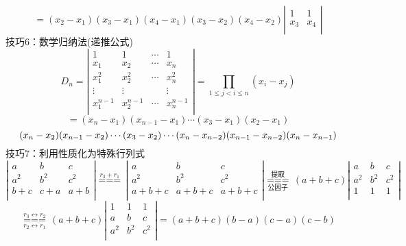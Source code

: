 $$
=({{x}_{2}}-{{x}_{1}})({{x}_{3}}-{{x}_{1}})({{x}_{4}}-{{x}_{1}})({{x}_{3}}-{{x}_{2}})({{x}_{4}}-{{x}_{2}})\left| \begin{matrix}
    1 & 1  \\
    {{x}_{3}} & {{x}_{4}}  \\
 \end{matrix} \right| 
$$
{\color{blue}技巧6：}数学归纳法(递推公式)
$$
D_{n}=\left| \begin{matrix}
    1 & 1 & \cdots  & 1  \\
    {{x}_{1}} & {{x}_{2}} & \cdots  & {{x}_{n}}  \\
    x_{1}^{2} & x_{2}^{2} & \cdots  & x_{n}^{2}  \\
    \vdots  & \vdots  & {} & \vdots   \\
    x_{1}^{n-1} & x_{2}^{n-1} & \cdots  & x_{n}^{n-1}  \\
 \end{matrix} \right|
 =\prod\limits_{1\le j<i\le n}{({{x}_{i}}-{{x}_{j}})} 
$$
$$
=({{x}_{n}}-{{x}_{1}})({{x}_{n-1}}-{{x}_{1}})\cdots({{x}_{3}}-{{x}_{1}})({{x}_{2}}-{{x}_{1}})
$$$$
({{x}_{n}}-{{x}_{2}})({{x}_{n-1}}-{{x}_{2}})\cdots 
({{x}_{3}}-{{x}_{2}}) \cdots
({{x}_{n}}-{{x}_{n-2}})({{x}_{n-1}}-{{x}_{n-2}}) \\ 
({{x}_{n}}-{{x}_{n-1}}) \\ 
$$  
{\color{blue}技巧7：}利用性质化为特殊行列式
$$
\left| \begin{matrix}
    a & b & c  \\
    {{a}^{2}} & {{b}^{2}} & {{c}^{2}}  \\
    b+c & c+a & a+b  \\
 \end{matrix} \right|
 \overset{{{r}_{3}}+{{r}_{1}}}{\mathop{===}}\,\left| \begin{matrix}
    a & b & c  \\
    {{a}^{2}} & {{b}^{2}} & {{c}^{2}}  \\
    a+b+c & a+b+c & a+b+c  \\
 \end{matrix} \right|
 \underset{\mbox{公因子}}{\overset{\mbox{提取}}{\mathop{===}}}\,(a+b+c)\left| \begin{matrix}
    a & b & c  \\
    {{a}^{2}} & {{b}^{2}} & {{c}^{2}}  \\
    1 & 1 & 1  \\
 \end{matrix} \right|
 $$$$
\underset{{{r}_{2}}\leftrightarrow{{r}_{1}}}{\overset{{{r}_{3}}\leftrightarrow {{r}_{2}}}{\mathop{===}}}\,(a+b+c)\left| \begin{matrix}
    1 & 1 & 1  \\
    a & b & c  \\
    {{a}^{2}} & {{b}^{2}} & {{c}^{2}}  \\
 \end{matrix} \right|
 =(a+b+c)(b-a)(c-a)(c-b)
$$
